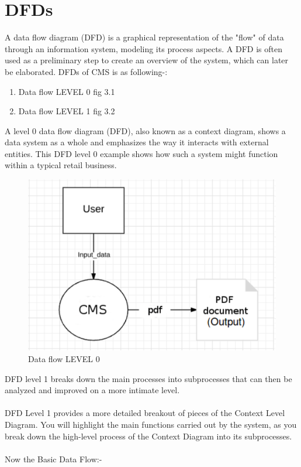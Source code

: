 \section{DFDs}
A data flow diagram (DFD) is a graphical representation of the "flow" of data through an information system, modeling its process aspects. A DFD is often used as a preliminary step to create an overview of the system, which can later be elaborated. DFDs of CMS is as following-:
\begin{enumerate}
\item Data flow LEVEL 0 fig 3.1
\item Data flow LEVEL 1 fig 3.2

\end{enumerate}

A level 0 data flow diagram (DFD), also known as a context diagram, shows a data system as a whole and emphasizes the way it interacts with external entities. This DFD level 0 example shows how such a system might function within a typical retail business.

\begin{figure}[h!]
\centering \includegraphics[scale=0.55]{input/images/cms1.pdf}
\caption{Data flow LEVEL 0}
\label{fig:DFDs}
\end{figure}

DFD level 1 breaks down the main processes into subprocesses that can then be analyzed and improved on a more intimate level.\\\\
DFD Level 1 provides a more detailed breakout of pieces of the Context Level Diagram. You will highlight the main functions carried out by the system, as you break down the high-level process of the Context Diagram into its subprocesses.\\\\
Now the Basic Data Flow:-

